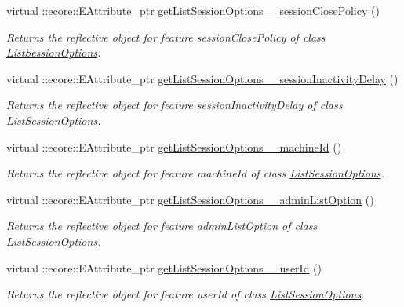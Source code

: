 \begin{DoxyCompactItemize}
virtual ::ecore::EAttribute\_\-ptr \hyperlink{classUMS__Data_1_1UMS__DataPackage_ae6f55b48b9b8be80a35a6f9339e1f7ba}{getListSessionOptions\_\-\_\-sessionClosePolicy} ()
\begin{DoxyCompactList}\small\item\em Returns the reflective object for feature sessionClosePolicy of class \hyperlink{classUMS__Data_1_1ListSessionOptions}{ListSessionOptions}. \item\end{DoxyCompactList}\item 
virtual ::ecore::EAttribute\_\-ptr \hyperlink{classUMS__Data_1_1UMS__DataPackage_aca55e061b4375a3c2c7afcb53abf05f6}{getListSessionOptions\_\-\_\-sessionInactivityDelay} ()
\begin{DoxyCompactList}\small\item\em Returns the reflective object for feature sessionInactivityDelay of class \hyperlink{classUMS__Data_1_1ListSessionOptions}{ListSessionOptions}. \item\end{DoxyCompactList}\item 
virtual ::ecore::EAttribute\_\-ptr \hyperlink{classUMS__Data_1_1UMS__DataPackage_a0cc575ea8fb36ba06724603d6c2a3b04}{getListSessionOptions\_\-\_\-machineId} ()
\begin{DoxyCompactList}\small\item\em Returns the reflective object for feature machineId of class \hyperlink{classUMS__Data_1_1ListSessionOptions}{ListSessionOptions}. \item\end{DoxyCompactList}\item 
virtual ::ecore::EAttribute\_\-ptr \hyperlink{classUMS__Data_1_1UMS__DataPackage_ab03f69dfebdf1df42c627f1d006438ad}{getListSessionOptions\_\-\_\-adminListOption} ()
\begin{DoxyCompactList}\small\item\em Returns the reflective object for feature adminListOption of class \hyperlink{classUMS__Data_1_1ListSessionOptions}{ListSessionOptions}. \item\end{DoxyCompactList}\item 
virtual ::ecore::EAttribute\_\-ptr \hyperlink{classUMS__Data_1_1UMS__DataPackage_ac6ea5c9fcf7e36876448e27b8c5524fd}{getListSessionOptions\_\-\_\-userId} ()
\begin{DoxyCompactList}\small\item\em Returns the reflective object for feature userId of class \hyperlink{classUMS__Data_1_1ListSessionOptions}{ListSessionOptions}. \item\end{DoxyCompactList}\item 

\end{DoxyCompactItemize}
